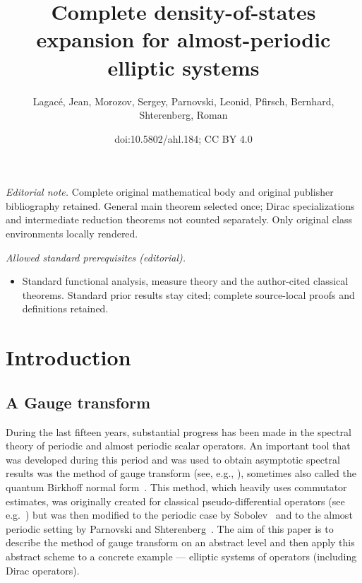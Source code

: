 \documentclass[10pt]{amsart}
\title{Complete density-of-states expansion for almost-periodic elliptic systems}
\author{Lagacé, Jean, Morozov, Sergey, Parnovski, Leonid, Pfirsch, Bernhard, Shterenberg, Roman}
\date{doi:10.5802/ahl.184; CC BY 4.0}
\theoremstyle{definition}\newtheorem{defi}[theo]{Definition}\newtheorem{rema}[theo]{Remark}\newtheorem{exam}[theo]{Example}\newtheorem{nota}[theo]{Notation}
\begin{document}
\maketitle
\noindent\textit{Editorial note.} Complete original mathematical body and original publisher bibliography retained. General main theorem selected once; Dirac specializations and intermediate reduction theorems not counted separately. Only original class environments locally rendered.\par\medskip
\noindent\textit{Allowed standard prerequisites (editorial).}\begin{itemize}
\item Standard functional analysis, measure theory and the author-cited classical theorems. Standard prior results stay cited; complete source-local proofs and definitions retained.
\end{itemize}\medskip
\tableofcontents


\section{Introduction}



\subsection{A Gauge transform}

During the last fifteen years, substantial progress has been made in the spectral theory of periodic and almost periodic scalar operators. An important tool that was developed during this period and was used to obtain asymptotic spectral results was the method of gauge transform (see, e.g., \cite{Ivrii2018,MorParSht2014,ParSob2010,
ParSht2012,
ParSht2016,ParSht2019,Sobolev2005,Sobolev2006}), sometimes also called the quantum Birkhoff normal form~\cite{LaurentVuNgoc}. This method, which heavily uses commutator estimates, was originally created for classical pseudo-differential operators (see e.g.~\cite{Rozenbljum1978,Weinstein1977}) but was then modified to the periodic case by Sobolev~\cite{Sobolev2005,Sobolev2006} and to the almost periodic setting by Parnovski and Shterenberg~\cite{ParSht2012}. The aim of this paper is to describe the method of gauge transform on an abstract level and then apply this abstract scheme to a concrete example --- elliptic systems of operators (including Dirac operators).
\end{document}

